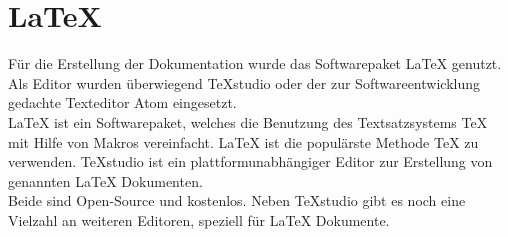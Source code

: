 \section{LaTeX}
Für die Erstellung der Dokumentation wurde das Softwarepaket LaTeX genutzt. Als Editor wurden überwiegend TeXstudio oder der zur Softwareentwicklung gedachte Texteditor Atom eingesetzt.\\
LaTeX ist ein Softwarepaket, welches die Benutzung des Textsatzsystems TeX mit Hilfe von Makros vereinfacht.
LaTeX ist die populärste Methode TeX zu verwenden.
TeXstudio ist ein plattformunabhängiger Editor zur Erstellung von genannten LaTeX Dokumenten.\\
Beide sind Open-Source und kostenlos. Neben TeXstudio gibt es noch eine Vielzahl an weiteren Editoren, speziell für LaTeX Dokumente.

